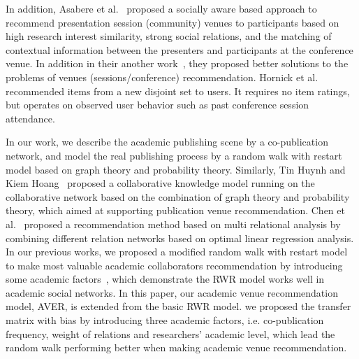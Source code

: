 \documentclass[9pt]{acm_proc_article-sp}
\begin{document}
In addition, Asabere et al.~\cite{asabere2014improving} proposed a socially aware based approach to recommend presentation session (community) venues to participants based on high research interest similarity, strong social relations, and the matching of contextual information between the presenters and participants at the conference venue. In addition in their another work~\cite{xia2013socially}, they proposed better solutions to the problems of venues (sessions/conference) recommendation. Hornick et al.~\cite{hornick2012extending} recommended items from a new disjoint set to users. It requires no item ratings, but operates on observed user behavior such as past conference session attendance.

In our work, we describe the academic publishing scene by a co-publication network, and model the real publishing process by a random walk with restart model based on graph theory and probability theory. Similarly, Tin Huynh and Kiem Hoang~\cite{huynh2012modeling} proposed a collaborative knowledge model running on the collaborative network based on the combination of graph theory and probability theory, which aimed at supporting publication venue recommendation. Chen et al.~\cite{chen2012social} proposed a recommendation method based on multi relational analysis by combining different relation networks based on optimal linear regression analysis. In our previous works, we proposed a modified random walk with restart model to make most valuable academic collaborators recommendation by introducing some academic factors~\cite{xia2014mvcwalker}, which demonstrate the RWR model works well in academic social networks. In this paper, our academic venue recommendation model, AVER, is extended from the basic RWR model. we proposed the transfer matrix with bias by introducing three academic factors, i.e. co-publication frequency, weight of relations and researchers' academic level, which lead the random walk performing better when making academic venue recommendation.
\end{document}
